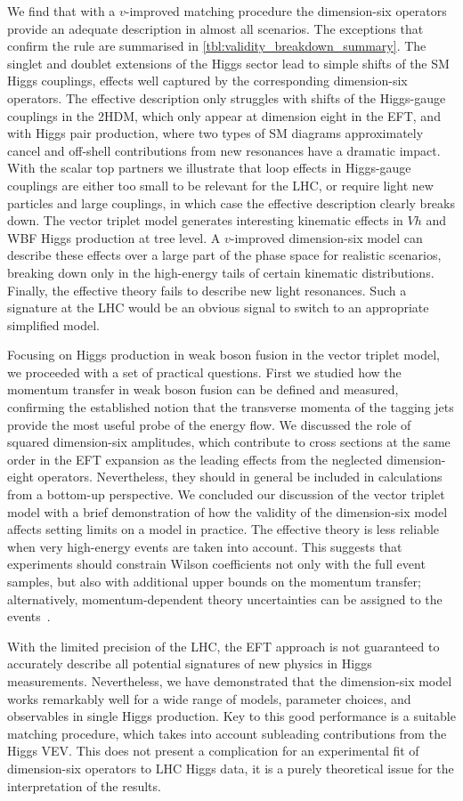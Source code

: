We find that with a $v$-improved matching procedure the dimension-six
operators provide an adequate description in almost all scenarios. The
exceptions that confirm the rule are summarised in
\autoref{tbl:validity_breakdown_summary}. The singlet and doublet
extensions of the Higgs sector lead to simple shifts of the SM Higgs
couplings, effects well captured by the corresponding dimension-six
operators. The effective description only struggles with shifts of the
Higgs-gauge couplings in the 2HDM, which only appear at dimension
eight in the EFT, and with Higgs pair production, where two types of
SM diagrams approximately cancel and off-shell contributions from new
resonances have a dramatic impact.  With the scalar top partners we
illustrate that loop effects in Higgs-gauge couplings are either too
small to be relevant for the LHC, or require light new particles and
large couplings, in which case the effective description clearly
breaks down. The vector triplet model generates interesting kinematic
effects in $Vh$ and WBF Higgs production at tree level. A $v$-improved
dimension-six model can describe these effects over a large part of
the phase space for realistic scenarios, breaking down only in the
high-energy tails of certain kinematic distributions. Finally, the
effective theory fails to describe new light resonances. Such a
signature at the LHC would be an obvious signal to switch to an
appropriate simplified model.

Focusing on Higgs production in weak boson fusion in the vector
triplet model, we proceeded with a set of practical questions. First
we studied how the momentum transfer in weak boson fusion can be
defined and measured, confirming the established notion that the
transverse momenta of the tagging jets provide the most useful probe
of the energy flow. We discussed the role of squared dimension-six
amplitudes, which contribute to cross sections at the same order in
the EFT expansion as the leading effects from the neglected
dimension-eight operators. Nevertheless, they should in general be
included in calculations from a bottom-up perspective. We concluded
our discussion of the vector triplet model with a brief demonstration
of how the validity of the dimension-six model affects setting limits
on a model in practice. The effective theory is less reliable when
very high-energy events are taken into account. This suggests that
experiments should constrain Wilson coefficients not only with the
full event samples, but also with additional upper bounds on the
momentum transfer; alternatively, momentum-dependent theory
uncertainties can be assigned to the events~\cite{Berthier:2016bke}.

With the limited precision of the LHC, the EFT approach is not
guaranteed to accurately describe all potential signatures of new
physics in Higgs measurements. Nevertheless, we have demonstrated that
the dimension-six model works remarkably well for a wide range of
models, parameter choices, and observables in single Higgs
production. Key to this good performance is a suitable matching
procedure, which takes into account subleading contributions from the
Higgs VEV. This does not present a complication for an experimental
fit of dimension-six operators to LHC Higgs data, it is a purely
theoretical issue for the interpretation of the results.